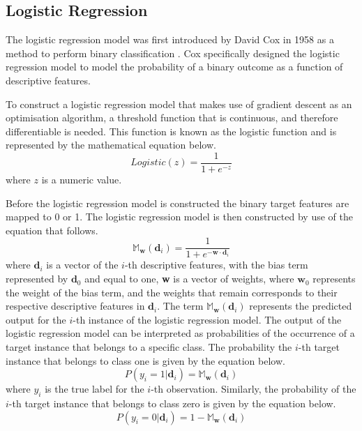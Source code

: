 \documentclass[10pt, conference]{IEEEtran}
\begin{document}
\subsection{Logistic Regression} \label{section: logistic_regression_background}

The logistic regression model was first introduced by David Cox in 1958 as a method to perform binary
classification \cite{logistic_regression_ref}. Cox specifically designed the logistic regression
model to model the probability of a binary outcome as a function of descriptive features.

To construct a logistic regression model that makes use of gradient descent as an optimisation
algorithm, a threshold function that is continuous, and therefore differentiable is needed. This function
is known as the logistic function and is represented by the mathematical equation below.
\begin{equation}
    Logistic(z) = \frac{1}{1 + e^{-z}} \label{eq: logistic_function}
\end{equation}
where $z$ is a numeric value.

Before the logistic regression model is constructed the binary target features are mapped to 0 or 1.
The logistic regression model is then constructed by use of the equation that follows.
\begin{equation}
    \mathbb{M}_{\textbf{w}}(\textbf{d}_i) = \frac{1}{1 + e^{-\textbf{w} \cdot \textbf{d}_i}} \label{eq: logistic_regression_equation}
\end{equation}
where $\textbf{d}_i$ is a vector of the $i$-th descriptive features, with the bias term represented by $\textbf{d}_0$ and equal to one,
\textbf{w} is a vector of weights, where $\textbf{w}_0$ represents the weight of the bias term, and the weights that remain corresponds
to their respective descriptive features in $\textbf{d}_i$. The term $\mathbb{M}_{\textbf{w}}(\textbf{d}_i)$ represents the predicted output
for the $i$-th instance of the logistic regression model. The output of the logistic regression model can be interpreted as probabilities
of the occurrence of a target instance that belongs to a specific class. The probability the $i$-th target instance that belongs to class one
is given by the equation below.
\begin{equation}
    P(y_i = 1|\textbf{d}_i) = \mathbb{M}_{\textbf{w}}(\textbf{d}_i) \label{eq: classified_class_1}
\end{equation}
where $y_i$ is the true label for the $i$-th observation. Similarly, the probability of the $i$-th target instance that belongs to class
zero is given by the equation below.
\begin{equation}
    P(y_i = 0|\textbf{d}_i) = 1 - \mathbb{M}_{\textbf{w}}(\textbf{d}_i) \label{eq: classified_class_0}
\end{equation}
\end{document}
